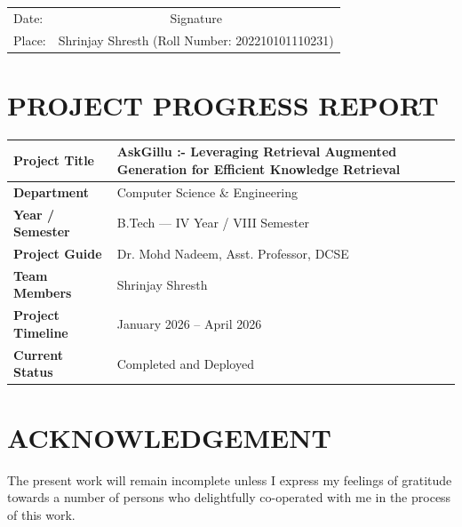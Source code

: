 \documentclass[12pt,a4paper]{report}
\begin{document}
\vspace{2cm}

\vspace{1cm}
\noindent
\begin{tabularx}{\textwidth}{@{}X c@{}}
Date: & \fontsize{10}{12}\selectfont Signature \\
Place: & Shrinjay Shresth (Roll Number: 202210101110231) \\
\end{tabularx}

\clearpage

\chapter*{PROJECT PROGRESS REPORT}

\begin{table}[h]
\centering
\begin{tabularx}{\textwidth}{|l|X|}
\hline
\textbf{Project Title} & AskGillu :- Leveraging Retrieval Augmented Generation for Efficient Knowledge Retrieval \\ \hline
\textbf{Department} & Computer Science \& Engineering \\ \hline
\textbf{Year / Semester} & B.Tech --- IV Year / VIII Semester \\ \hline
\textbf{Project Guide} & Dr. Mohd Nadeem, Asst. Professor, DCSE \\ \hline
\textbf{Team Members} & Shrinjay Shresth \\ \hline
\textbf{Project Timeline} & January 2026 -- April 2026 \\ \hline
\textbf{Current Status} & Completed and Deployed \\ \hline
\end{tabularx}
\end{table}

\clearpage

\chapter*{ACKNOWLEDGEMENT}

The present work will remain incomplete unless I express my feelings of gratitude towards a number of persons who delightfully co-operated with me in the process of this work.
\end{document}
